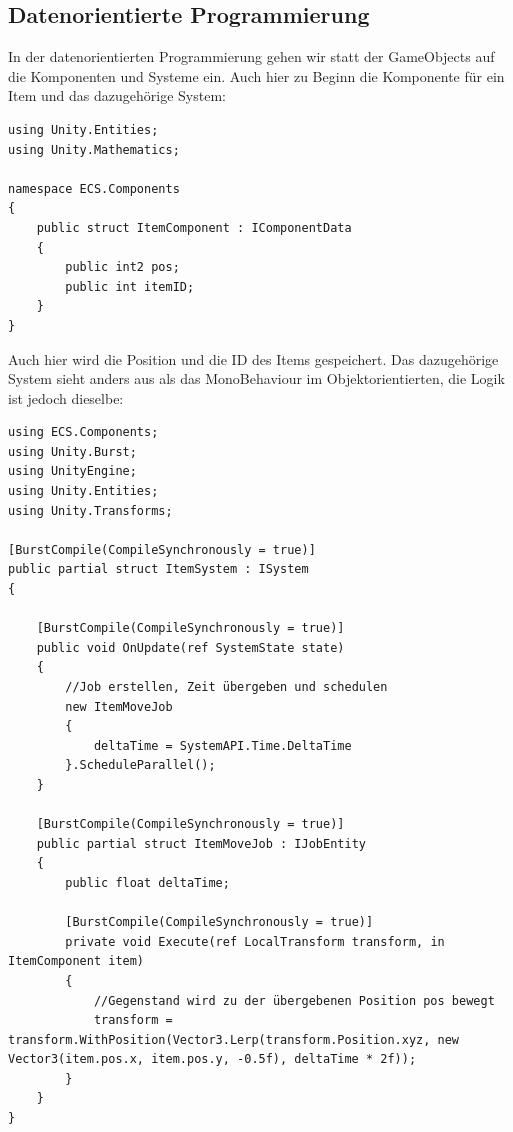 \subsection{Datenorientierte Programmierung}
In der datenorientierten Programmierung gehen wir statt der GameObjects auf die Komponenten und Systeme ein. Auch hier zu Beginn die Komponente für ein Item und das dazugehörige System:
\begin{lstlisting}[style=code, caption={Item Komponente ECS}]
using Unity.Entities;
using Unity.Mathematics;

namespace ECS.Components
{
    public struct ItemComponent : IComponentData
    {
        public int2 pos;
        public int itemID;
    }
}
\end{lstlisting}
Auch hier wird die Position und die ID des Items gespeichert. Das dazugehörige System sieht anders aus als das MonoBehaviour im Objektorientierten, die Logik ist jedoch dieselbe:
\begin{lstlisting}[style=code, caption={Item System}]
using ECS.Components;
using Unity.Burst;
using UnityEngine;
using Unity.Entities;
using Unity.Transforms;

[BurstCompile(CompileSynchronously = true)]
public partial struct ItemSystem : ISystem
{
    
    [BurstCompile(CompileSynchronously = true)]
    public void OnUpdate(ref SystemState state)
    {
    	//Job erstellen, Zeit übergeben und schedulen
        new ItemMoveJob
        {
            deltaTime = SystemAPI.Time.DeltaTime
        }.ScheduleParallel();
    }

    [BurstCompile(CompileSynchronously = true)]
    public partial struct ItemMoveJob : IJobEntity
    {
        public float deltaTime;
        
        [BurstCompile(CompileSynchronously = true)]
        private void Execute(ref LocalTransform transform, in ItemComponent item)
        {
        	//Gegenstand wird zu der übergebenen Position pos bewegt
            transform = transform.WithPosition(Vector3.Lerp(transform.Position.xyz, new Vector3(item.pos.x, item.pos.y, -0.5f), deltaTime * 2f));
        }
    }
}
\end{lstlisting}
